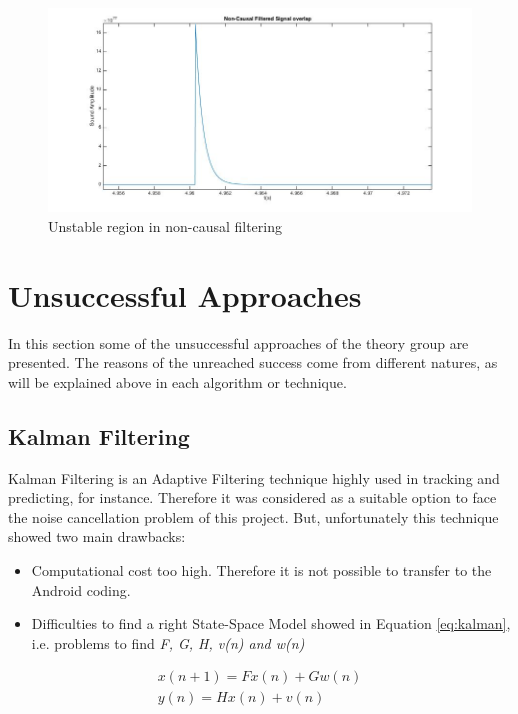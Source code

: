 \documentclass[11pt,a4paper,english]{book}  %
\theoremstyle{definition}  %
\theoremstyle{plain}  %
\theoremstyle{remark}  %
\begin{document}
		\begin{figure}[h]
		\centering
		\includegraphics[width=15cm]{images/theory/noncunstableoverlap.jpg}
		\caption{Unstable region in non-causal filtering}
		\label{fig:noncunstableoverlap}
		\end{figure}		
	


\section{Unsuccessful Approaches}

In this section some of the unsuccessful approaches of the theory group are presented. The reasons of the unreached success come from different natures, as will be explained above in each algorithm or technique.

	\subsection{Kalman Filtering}
	Kalman Filtering is an Adaptive Filtering technique highly used in tracking and predicting, for instance. Therefore it was considered as a suitable option to face the noise cancellation problem of this project. But, unfortunately this technique showed two main drawbacks:
	
	\begin{itemize}
	\item Computational cost too high. Therefore it is not possible to transfer to the Android coding.
	\item Difficulties to find a right State-Space Model showed in Equation \ref{eq:kalman}, i.e. problems to find \textit{F, G, H, v(n) and w(n)}
	\end{itemize}
	
	
	\begin{subequations}
	\label{eq:kalman}
	\begin{align}
	x(n+1)=Fx(n)+Gw(n)\\
	y(n)=Hx(n)+v(n)	
	\end{align}
	
	\end{subequations}
	
\end{document}
